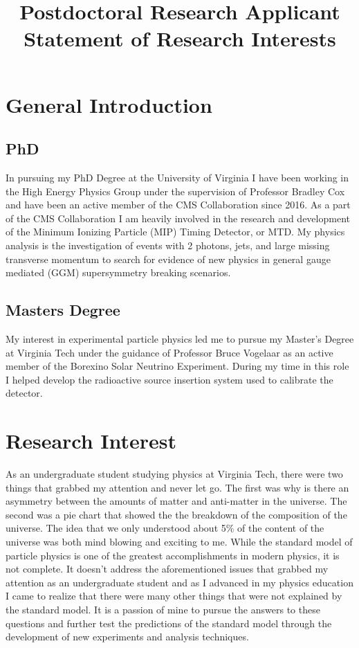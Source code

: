 \documentclass[10pt,a4paper,sans,english]{moderncv}        %
\title{Postdoctoral Research Applicant \newline{} {\LARGE Statement of Research Interests}}                               %
\begin{document}
\makecvtitle
\section{General Introduction}

\subsection{PhD}
In pursuing my PhD Degree at the University of Virginia I have been working in the High Energy Physics Group under the supervision of Professor Bradley Cox and have been an active member of the CMS Collaboration since 2016.  As a part of the CMS Collaboration I am heavily involved in the research and development of the Minimum Ionizing Particle (MIP) Timing Detector, or MTD.  My physics analysis is the investigation of events with 2 photons, jets, and large missing transverse momentum to search for evidence of new physics in general gauge mediated (GGM) supersymmetry breaking scenarios.

\subsection{Masters Degree}
My interest in experimental particle physics led me to pursue my Master's Degree at Virginia Tech under the guidance of Professor Bruce Vogelaar as an active member of the Borexino Solar Neutrino Experiment.  During my time in this role I helped develop the radioactive source insertion system used to calibrate the detector.

\section{Research Interest}
As an undergraduate student studying physics at Virginia Tech, there were two things that grabbed my attention and never let go.  The first was why is there an asymmetry between the amounts of matter and anti-matter in the universe.  The second was a pie chart that showed the the breakdown of the composition of the universe.  The idea that we only understood about 5$\%$ of the content of the universe was both mind blowing and exciting to me.  While the standard model of particle physics is one of the greatest accomplishments in modern physics, it is not complete.  It doesn't address the aforementioned issues that grabbed my attention as an undergraduate student and as I advanced in my physics education I came to realize that there were many other things that were not explained by the standard model.  It is a passion of mine to pursue the answers to these questions and further test the predictions of the standard model through the development of new experiments and analysis techniques.
\end{document}

